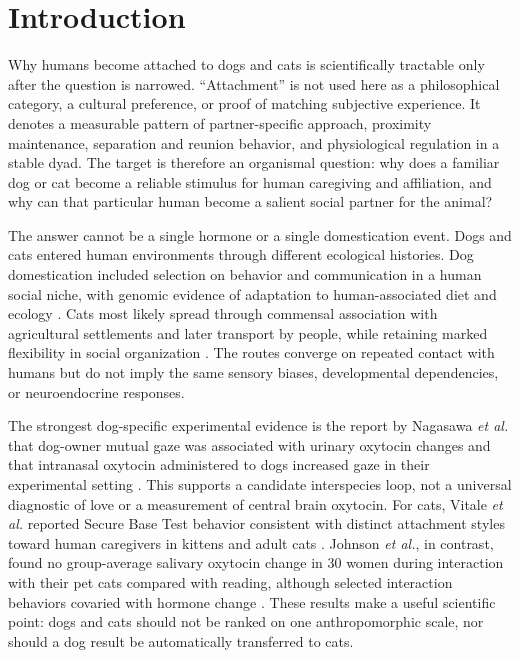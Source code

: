 \documentclass[conference]{IEEEtran}
\begin{document}
\section{Introduction}

Why humans become attached to dogs and cats is scientifically tractable only after the question is narrowed. ``Attachment'' is not used here as a philosophical category, a cultural preference, or proof of matching subjective experience. It denotes a measurable pattern of partner-specific approach, proximity maintenance, separation and reunion behavior, and physiological regulation in a stable dyad. The target is therefore an organismal question: why does a familiar dog or cat become a reliable stimulus for human caregiving and affiliation, and why can that particular human become a salient social partner for the animal?

The answer cannot be a single hormone or a single domestication event. Dogs and cats entered human environments through different ecological histories. Dog domestication included selection on behavior and communication in a human social niche, with genomic evidence of adaptation to human-associated diet and ecology \cite{axelsson2013}. Cats most likely spread through commensal association with agricultural settlements and later transport by people, while retaining marked flexibility in social organization \cite{driscoll2007,ottoni2017}. The routes converge on repeated contact with humans but do not imply the same sensory biases, developmental dependencies, or neuroendocrine responses.

The strongest dog-specific experimental evidence is the report by Nagasawa \emph{et al.} that dog-owner mutual gaze was associated with urinary oxytocin changes and that intranasal oxytocin administered to dogs increased gaze in their experimental setting \cite{nagasawa2015}. This supports a candidate interspecies loop, not a universal diagnostic of love or a measurement of central brain oxytocin. For cats, Vitale \emph{et al.} reported Secure Base Test behavior consistent with distinct attachment styles toward human caregivers in kittens and adult cats \cite{vitale2019}. Johnson \emph{et al.}, in contrast, found no group-average salivary oxytocin change in 30 women during interaction with their pet cats compared with reading, although selected interaction behaviors covaried with hormone change \cite{johnson2021}. These results make a useful scientific point: dogs and cats should not be ranked on one anthropomorphic scale, nor should a dog result be automatically transferred to cats.
\end{document}
